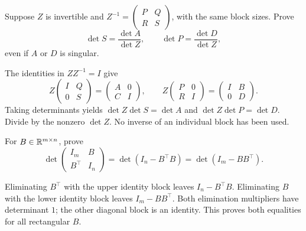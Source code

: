 \begin{problem}\label{ex:07:inverse-blocks}
Suppose \(Z\) is invertible and
\(Z^{-1}=\begin{pmatrix}P&Q\\R&S\end{pmatrix}\), with the same block
sizes. Prove
\[
 \det S=\frac{\det A}{\det Z},\qquad
 \det P=\frac{\det D}{\det Z},
\]
even if \(A\) or \(D\) is singular.
\end{problem}
\begin{solution}
The identities in \(ZZ^{-1}=I\) give
\[
 Z\begin{pmatrix}I&Q\\0&S\end{pmatrix}
   =\begin{pmatrix}A&0\\C&I\end{pmatrix},\qquad
 Z\begin{pmatrix}P&0\\R&I\end{pmatrix}
   =\begin{pmatrix}I&B\\0&D\end{pmatrix}.
\]
Taking determinants yields \(\det Z\det S=\det A\) and
\(\det Z\det P=\det D\). Divide by the nonzero \(\det Z\).
No inverse of an individual block has been used.
\end{solution}

\begin{problem}\label{ex:07:rectangular-gram}
For \(B\in\mathbb R^{m\times n}\), prove
\[
 \det\begin{pmatrix}I_m&B\\B^\top&I_n\end{pmatrix}
 =\det(I_n-B^\top B)=\det(I_m-BB^\top).
\]
\end{problem}
\begin{solution}
Eliminating \(B^\top\) with the upper identity block leaves \(I_n-B^\top B\).
Eliminating \(B\) with the lower identity block leaves \(I_m-BB^\top\).
Both elimination multipliers have determinant \(1\); the other diagonal
block is an identity. This proves both equalities for all rectangular \(B\).
\end{solution}

